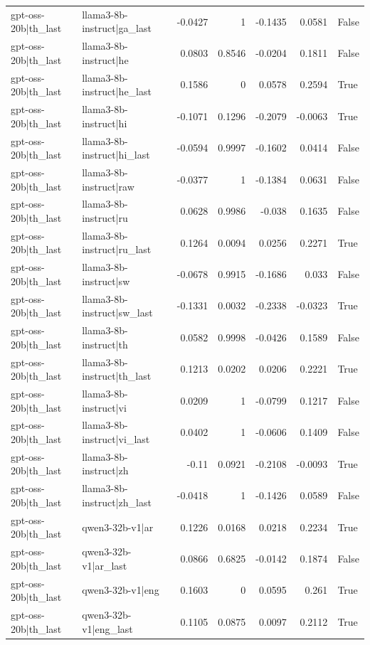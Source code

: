 \begin{table}
\begin{tabular}{l l r r r r l}
gpt-oss-20b|th_last & llama3-8b-instruct|ga_last & -0.0427 & 1 & -0.1435 & 0.0581 & False \\
gpt-oss-20b|th_last & llama3-8b-instruct|he & 0.0803 & 0.8546 & -0.0204 & 0.1811 & False \\
gpt-oss-20b|th_last & llama3-8b-instruct|he_last & 0.1586 & 0 & 0.0578 & 0.2594 & True \\
gpt-oss-20b|th_last & llama3-8b-instruct|hi & -0.1071 & 0.1296 & -0.2079 & -0.0063 & True \\
gpt-oss-20b|th_last & llama3-8b-instruct|hi_last & -0.0594 & 0.9997 & -0.1602 & 0.0414 & False \\
gpt-oss-20b|th_last & llama3-8b-instruct|raw & -0.0377 & 1 & -0.1384 & 0.0631 & False \\
gpt-oss-20b|th_last & llama3-8b-instruct|ru & 0.0628 & 0.9986 & -0.038 & 0.1635 & False \\
gpt-oss-20b|th_last & llama3-8b-instruct|ru_last & 0.1264 & 0.0094 & 0.0256 & 0.2271 & True \\
gpt-oss-20b|th_last & llama3-8b-instruct|sw & -0.0678 & 0.9915 & -0.1686 & 0.033 & False \\
gpt-oss-20b|th_last & llama3-8b-instruct|sw_last & -0.1331 & 0.0032 & -0.2338 & -0.0323 & True \\
gpt-oss-20b|th_last & llama3-8b-instruct|th & 0.0582 & 0.9998 & -0.0426 & 0.1589 & False \\
gpt-oss-20b|th_last & llama3-8b-instruct|th_last & 0.1213 & 0.0202 & 0.0206 & 0.2221 & True \\
gpt-oss-20b|th_last & llama3-8b-instruct|vi & 0.0209 & 1 & -0.0799 & 0.1217 & False \\
gpt-oss-20b|th_last & llama3-8b-instruct|vi_last & 0.0402 & 1 & -0.0606 & 0.1409 & False \\
gpt-oss-20b|th_last & llama3-8b-instruct|zh & -0.11 & 0.0921 & -0.2108 & -0.0093 & True \\
gpt-oss-20b|th_last & llama3-8b-instruct|zh_last & -0.0418 & 1 & -0.1426 & 0.0589 & False \\
gpt-oss-20b|th_last & qwen3-32b-v1|ar & 0.1226 & 0.0168 & 0.0218 & 0.2234 & True \\
gpt-oss-20b|th_last & qwen3-32b-v1|ar_last & 0.0866 & 0.6825 & -0.0142 & 0.1874 & False \\
gpt-oss-20b|th_last & qwen3-32b-v1|eng & 0.1603 & 0 & 0.0595 & 0.261 & True \\
gpt-oss-20b|th_last & qwen3-32b-v1|eng_last & 0.1105 & 0.0875 & 0.0097 & 0.2112 & True \\

\end{tabular}
\end{table}

